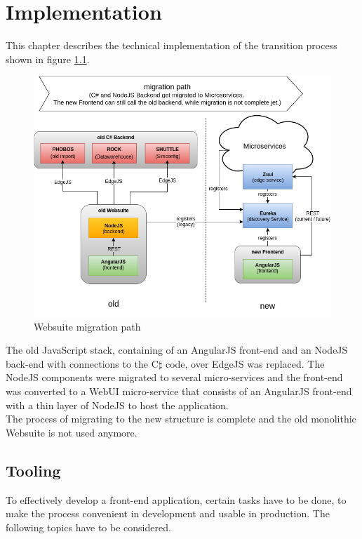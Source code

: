 
\chapter{Implementation}
This chapter describes the technical implementation of the transition process shown in figure \ref{fig:websuite-migration}.
\begin{figure}[H]
	\centering\includegraphics[width=1\textwidth]{res/Websuite_migration}
	\caption{Websuite migration path}
	\label{fig:websuite-migration}
\end{figure}

The old JavaScript stack, containing of an AngularJS front-end and an NodeJS back-end with connections to the C$\sharp$ code, over EdgeJS was replaced. The NodeJS components were migrated to several micro-services and the front-end was converted to a WebUI micro-service that consists of an AngularJS front-end with a thin layer of NodeJS to host the application.\\
The process of migrating to the new structure is complete and the old monolithic Websuite is not used anymore.



\section{Tooling}
To effectively develop a front-end application, certain tasks have to be done, to make the process convenient in development and usable in production. The following topics have to be considered.


